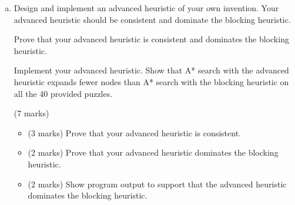 \documentclass[12pt]{article}
\begin{document}
\begin{enumerate}[(a)]
 
\item
Design and implement an advanced heuristic of your own invention. Your advanced heuristic should be consistent and dominate the blocking heuristic. 

Prove that your advanced heuristic is consistent and dominates the blocking heuristic.

Implement your advanced heuristic. Show that A* search with the advanced heuristic expands fewer nodes than A* search with the blocking heuristic on all the 40 provided puzzles.

\begin{markscheme}
(7 marks)

\begin{itemize}
\item (3 marks) Prove that your advanced heuristic is consistent.
\item (2 marks) Prove that your advanced heuristic dominates the blocking heuristic. 
\item (2 marks) Show program output to support that the advanced heuristic dominates the blocking heuristic. 
\end{itemize}

\end{markscheme}


\end{enumerate}
\end{document}
